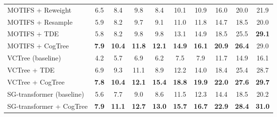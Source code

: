 \documentclass[letterpaper]{article} \usepackage{aaai21}  \usepackage{times}  \usepackage{helvet} \usepackage{courier}  \usepackage[hyphens]{url}  \usepackage{graphicx} \urlstyle{rm} \def\UrlFont{\rm}  \usepackage{natbib}  \usepackage{caption} \frenchspacing  \setlength{\pdfpagewidth}{8.5in}  \setlength{\pdfpageheight}{11in}  \usepackage{amsmath,amsthm}
\begin{document}
\begin{table*}[t]
{\begin{tabular}{lccccccccc}
\multicolumn{1}{l|}{MOTIFS + Reweight}         & 6.5          & 8.4           & \multicolumn{1}{c|}{9.8}           & 8.4           & 10.1          & \multicolumn{1}{c|}{10.9}          & 16.0          & 20.0          & 21.9          \\
\multicolumn{1}{l|}{MOTIFS + Resample}         & 5.9          & 8.2           & \multicolumn{1}{c|}{9.7}           & 9.1           & 11.0          & \multicolumn{1}{c|}{11.8}          & 14.7          & 18.5          & 20.0          \\
\multicolumn{1}{l|}{MOTIFS + TDE}              & 5.8          & 8.2           & \multicolumn{1}{c|}{9.8}           & 9.8           & 13.1          & \multicolumn{1}{c|}{14.9}          & 18.5          & 25.5          & \textbf{29.1} \\
\multicolumn{1}{l|}{MOTIFS + CogTree}          & \textbf{7.9} & \textbf{10.4} & \multicolumn{1}{c|}{\textbf{11.8}} & \textbf{12.1} & \textbf{14.9} & \multicolumn{1}{c|}{\textbf{16.1}} & \textbf{20.9} & \textbf{26.4} & 29.0          \\ \hline
\multicolumn{1}{l|}{VCTree (baseline)}         & 4.2          & 5.7           & \multicolumn{1}{c|}{6.9}           & 6.2           & 7.5           & \multicolumn{1}{c|}{7.9}           & 11.7          & 14.9          & 16.1          \\
\multicolumn{1}{l|}{VCTree + TDE}              & 6.9          & 9.3           & \multicolumn{1}{c|}{11.1}          & 8.9           & 12.2          & \multicolumn{1}{c|}{14.0}          & 18.4          & 25.4          & 28.7          \\
\multicolumn{1}{l|}{VCTree + CogTree}          & \textbf{7.8}           & \textbf{10.4}          & \multicolumn{1}{c|}{\textbf{12.1}}           & \textbf{15.4} & \textbf{18.8} & \multicolumn{1}{c|}{\textbf{19.9}} &    \textbf{22.0}       &    \textbf{27.6}       &    \textbf{29.7}       \\ \hline
\multicolumn{1}{l|}{SG-transformer (baseline)} & 5.6          & 7.7           & \multicolumn{1}{c|}{9.0}           & 8.6           & 11.5          & \multicolumn{1}{c|}{12.3}          & 14.4          & 18.5          & 20.2          \\
\multicolumn{1}{l|}{SG-transformer + CogTree}  & \textbf{7.9} & \textbf{11.1} & \multicolumn{1}{c|}{\textbf{12.7}} & \textbf{13.0} & \textbf{15.7} & \multicolumn{1}{c|}{\textbf{16.7}} & \textbf{22.9} & \textbf{28.4} & \textbf{31.0} \\ \hline
\end{tabular}}
\label{tab:sota}
\end{table*}
\end{document}
